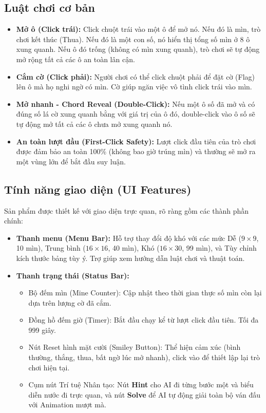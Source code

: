 \subsection{Luật chơi cơ bản}
\begin{itemize}
    \item \textbf{Mở ô (Click trái):} Click chuột trái vào một ô để mở nó. Nếu đó là mìn, trò chơi kết thúc (Thua). Nếu đó là một con số, nó hiển thị tổng số mìn ở 8 ô xung quanh. Nếu ô đó trống (không có mìn xung quanh), trò chơi sẽ tự động mở rộng tất cả các ô an toàn lân cận.
    \item \textbf{Cắm cờ (Click phải):} Người chơi có thể click chuột phải để đặt cờ (Flag) lên ô mà họ nghi ngờ có mìn. Cờ giúp ngăn việc vô tình click trái vào mìn.
    \item \textbf{Mở nhanh - Chord Reveal (Double-Click):} Nếu một ô số đã mở và có đúng số lá cờ xung quanh bằng với giá trị của ô đó, double-click vào ô số sẽ tự động mở tất cả các ô chưa mở xung quanh nó.
    \item \textbf{An toàn lượt đầu (First-Click Safety):} Lượt click đầu tiên của trò chơi được đảm bảo an toàn 100\% (không bao giờ trúng mìn) và thường sẽ mở ra một vùng lớn để bắt đầu suy luận.
\end{itemize}

\subsection{Tính năng giao diện (UI Features)}
Sản phẩm được thiết kế với giao diện trực quan, rõ ràng gồm các thành phần chính:
\begin{itemize}
    \item \textbf{Thanh menu (Menu Bar):} Hỗ trợ thay đổi độ khó với các mức Dễ ($9\times9$, 10 mìn), Trung bình ($16\times16$, 40 mìn), Khó ($16\times30$, 99 mìn), và Tùy chỉnh kích thước bảng tùy ý. Trợ giúp xem hướng dẫn luật chơi và thuật toán.
    \item \textbf{Thanh trạng thái (Status Bar):} 
    \begin{itemize}
        \item Bộ đếm mìn (Mine Counter): Cập nhật theo thời gian thực số mìn còn lại dựa trên lượng cờ đã cắm.
        \item Đồng hồ đếm giờ (Timer): Bắt đầu chạy kể từ lượt click đầu tiên. Tối đa 999 giây.
        \item Nút Reset hình mặt cười (Smiley Button): Thể hiện cảm xúc (bình thường, thắng, thua, bất ngờ lúc mở nhanh), click vào để thiết lập lại trò chơi hiện tại.
        \item Cụm nút Trí tuệ Nhân tạo: Nút \textbf{Hint} cho AI đi từng bước một và biểu diễn nước đi trực quan, và nút \textbf{Solve} để AI tự động giải toàn bộ ván đấu với Animation mượt mà.
    \end{itemize}
\end{itemize}
